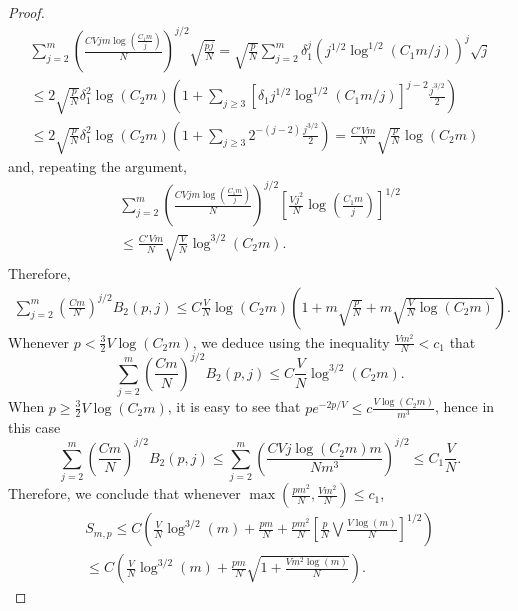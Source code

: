 \documentclass[10pt,a4paper]{amsart}
\def\l{\left}
\def\r{\right}
\begin{document}
\begin{proof}
\begin{multline*}
    \sum_{j=2}^m \l(\frac{CVjm\log\l( \frac{C_1m}{j} \r)}{N}\r)^{j/2}\sqrt{\frac{pj}{N}}
    =\sqrt{\frac{p}{N}}\sum_{j=2}^m \delta_1^j \l(j^{1/2}\log^{1/2}\l(C_1m/j\r)\r)^j \sqrt{j} 
    \\
    \leq 2\sqrt{\frac pN}\delta_1^2 \log(C_2m) \l(1 + \sum_{j\geq 3} \l[\delta_1 j^{1/2} \log^{1/2}\l(C_1m/j\r)\r]^{j-2}\frac{j^{3/2}}{2}\r)
    \\
    \leq 2\sqrt{\frac pN}\delta_1^2 \log(C_2m)\l( 1 + \sum_{j\geq 3} 2^{-(j-2)}\frac{j^{3/2}}{2}\r) = \frac{C'Vm}{N} \sqrt{\frac{p}{N}}\log(C_2m)
\end{multline*}
and, repeating the argument, 
\begin{multline*}
    \sum_{j=2}^m \l(\frac{CVjm\log\l( \frac{C_1m}{j} \r)}{N}\r)^{j/2}\l[\frac{Vj^2}{N}\log\l(\frac{C_1m}{j}\r)\r]^{1/2} 
    \\
    \leq \frac{C'Vm}{N}\sqrt{\frac{V}{N}}\log^{3/2}(C_2m).
\end{multline*}
Therefore, 
\begin{multline*}
    \sum_{j=2}^m \l(\frac{Cm}{N}\r)^{j/2} B_2(p,j) 
    \leq C\frac{V}{N}\log(C_2m)\l( 1+ m\sqrt{\frac{p}{N}} + m\sqrt{\frac{V}{N}\log(C_2m)}\r).
\end{multline*}
Whenever $p<\frac{3}{2}V\log(C_2m)$, we deduce using the inequality $\frac{Vm^2}{N}<c_1$ that 
\begin{equation}
\label{eq:B_2a}
\sum_{j=2}^m \l(\frac{Cm}{N}\r)^{j/2} B_2(p,j)\leq 
C\frac{V}{N}\log^{3/2}(C_2m).
\end{equation}
When $p\geq \frac{3}{2}V\log(C_2m)$, it is easy to see that $pe^{-2p/V}\leq c\frac{V\log(C_2m)}{m^3}$, hence in this case
\[
\sum_{j=2}^m \l(\frac{Cm}{N}\r)^{j/2} B_2(p,j)
\leq 
\sum_{j=2}^m \l(\frac{CV j \log(C_2 m)m}{Nm^3}\r)^{j/2} \leq C_1 \frac{V}{N}.
\]
Therefore, we conclude that whenever $\max\l( \frac{pm^2}{N},\frac{Vm^2}{N}\r)\leq c_1$, 
\begin{multline}
    \label{eq:S(m,p)}
S_{m,p}\leq C\l( \frac{V}{N}\log^{3/2}(m) +  \frac{pm}{N} + \frac{pm^2}{N} \l[\frac{p}{N}\bigvee \frac{V\log(m)}{N}\r]^{1/2}\r)
\\
\leq C\l( \frac{V}{N}\log^{3/2}(m) + \frac{pm}{N}\sqrt{1+\frac{Vm^2\log(m)}{N}}\r).
\end{multline}
\end{proof}
\end{document}
